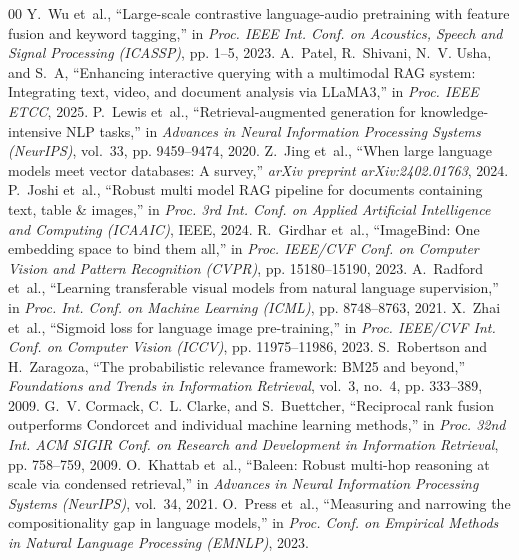 \documentclass[conference]{IEEEtran}
\begin{document}

\begin{thebibliography}{00}
\small
\setlength{\itemsep}{1pt plus 0.5pt minus 0.5pt}
\setlength{\parskip}{0pt}
Y.~Wu et~al., ``Large-scale contrastive language-audio pretraining with feature fusion and keyword tagging,'' in \emph{Proc. IEEE Int. Conf. on Acoustics, Speech and Signal Processing (ICASSP)}, pp. 1--5, 2023.
A.~Patel, R.~Shivani, N.~V. Usha, and S.~A, ``Enhancing interactive querying with a multimodal RAG system: Integrating text, video, and document analysis via LLaMA3,'' in \emph{Proc. IEEE ETCC}, 2025.
P.~Lewis et~al., ``Retrieval-augmented generation for knowledge-intensive NLP tasks,'' in \emph{Advances in Neural Information Processing Systems (NeurIPS)}, vol.~33, pp. 9459--9474, 2020.
Z.~Jing et~al., ``When large language models meet vector databases: A survey,'' \emph{arXiv preprint arXiv:2402.01763}, 2024.
P.~Joshi et~al., ``Robust multi model RAG pipeline for documents containing text, table \& images,'' in \emph{Proc. 3rd Int. Conf. on Applied Artificial Intelligence and Computing (ICAAIC)}, IEEE, 2024.
R.~Girdhar et~al., ``ImageBind: One embedding space to bind them all,'' in \emph{Proc. IEEE/CVF Conf. on Computer Vision and Pattern Recognition (CVPR)}, pp. 15180--15190, 2023.
A.~Radford et~al., ``Learning transferable visual models from natural language supervision,'' in \emph{Proc. Int. Conf. on Machine Learning (ICML)}, pp. 8748--8763, 2021.
X.~Zhai et~al., ``Sigmoid loss for language image pre-training,'' in \emph{Proc. IEEE/CVF Int. Conf. on Computer Vision (ICCV)}, pp. 11975--11986, 2023.
S.~Robertson and H.~Zaragoza, ``The probabilistic relevance framework: BM25 and beyond,'' \emph{Foundations and Trends in Information Retrieval}, vol.~3, no.~4, pp. 333--389, 2009.
G.~V. Cormack, C.~L. Clarke, and S.~Buettcher, ``Reciprocal rank fusion outperforms Condorcet and individual machine learning methods,'' in \emph{Proc. 32nd Int. ACM SIGIR Conf. on Research and Development in Information Retrieval}, pp. 758--759, 2009.
O.~Khattab et~al., ``Baleen: Robust multi-hop reasoning at scale via condensed retrieval,'' in \emph{Advances in Neural Information Processing Systems (NeurIPS)}, vol.~34, 2021.
O.~Press et~al., ``Measuring and narrowing the compositionality gap in language models,'' in \emph{Proc. Conf. on Empirical Methods in Natural Language Processing (EMNLP)}, 2023.

\end{thebibliography}
\end{document}
